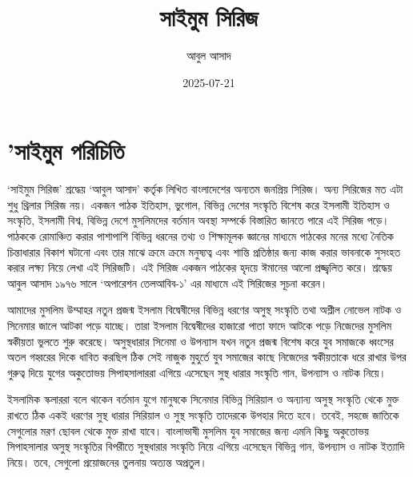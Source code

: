\documentclass[
]{book}
\title{সাইমুম সিরিজ}
\author{আবুল আসাদ}
\date{2025-07-21}
\begin{document}
\maketitle

{
\setcounter{tocdepth}{1}
\tableofcontents
}
\chapter*{'সাইমুম পরিচিতি}\label{ux9b8ux987ux9aeux9ae-ux9aaux9b0ux99aux9a4}

`সাইমুম সিরিজ' শ্রদ্ধেয় `আবুল আসাদ' কর্তৃক লিখিত বাংলাদেশের অন্যতম জনপ্রিয় সিরিজ। অন্য সিরিজের মত এটা শুধু থ্রিলার সিরিজ নয়। একজন পাঠক ইতিহাস, ভুগোল, বিভিন্ন দেশের সংস্কৃতি বিশেষ করে ইসলামী ইতিহাস ও সংস্কৃতি, ইসলামী বিশ্ব, বিভিন্ন দেশে মুসলিমদের বর্তমান অবস্থা সম্পর্কে বিস্তারিত জানতে পারে এই সিরিজ পড়ে। পাঠককে রোমাঞ্চিত করার পাশাপাশি বিভিন্ন ধরনের তথ্য ও শিক্ষামূলক জ্ঞানের মাধ্যমে পাঠকের মনের মধ্যে নৈতিক চিন্তাধারার বিকাশ ঘটানো এবং তার মাঝে ক্রমে ক্রমে মনুষ্যত্ব এবং শান্তি প্রতিষ্ঠার জন্য কাজ করার ভাবনাকে সুসংহত করার লক্ষ্য নিয়ে লেখা এই সিরিজটি। এই সিরিজ একজন পাঠকের হৃদয়ে ঈমানের আলো প্রজ্জ্বলিত করে। শ্রদ্ধেয় আবুল আসাদ ১৯৭৬ সালে `অপারেশন তেলআবিব-১' এর মাধ্যমে এই সিরিজের সূচনা করেন।

আমাদের মুসলিম উম্মাহর নতুন প্রজন্ম ইসলাম বিদ্বেষীদের বিভিন্ন ধরণের অসুস্থ সংস্কৃতি তথা অশ্লীল নোভেল নাটক ও সিনেমার জালে আটকা পড়ে যাচ্ছে। তারা ইসলাম বিদ্বেষীদের হাজারো পাতা ফাদে আটকে পড়ে নিজেদের মুসলিম স্বকীয়তা ভুলতে শুরু করেছে। অসুস্থধারার সিনেমা ও উপন্যাস যখন নতুন প্রজন্ম বিশেষ করে যুব সমাজকে ধ্বংসের অতল গহ্বরের দিকে ধাবিত করছিল ঠিক সেই নাজুক মুহুর্তে যুব সমাজের কাছে নিজেদের স্বকীয়তাকে ধরে রাখার উপর গুরুত্ব দিয়ে যুগের অকুতোভয় সিপাহসালাররা এগিয়ে এসেছেন সুস্থ ধারার সংস্কৃতি গান, উপন্যাস ও নাটক নিয়ে।

ইসলামিক স্কলাররা বলে থাকেন বর্তমান যুগে মানুষকে সিনেমার বিভিন্ন সিরিয়াল ও অন্যান্য অসুস্থ সংস্কৃতি থেকে মুক্ত রাখতে ঠিক একই ধরণের সুস্থ ধারার সিরিয়াল ও সুস্থ সংস্কৃতি তাদেরকে উপহার দিতে হবে। তবেই, সহজে জাতিকে সেগুলোর মরণ ছোবল থেকে মুক্ত রাখা যাবে। বাংলাভাষী মুসলিম যুব সমাজের জন্য এমনি কিছু অকুতোভয় সিপাহসালার অসুস্থ সংস্কৃতির বিপরীতে সুস্থধারার সংস্কৃতি নিয়ে এগিয়ে এসেছেন বিভিন্ন গান, উপন্যাস ও নাটক ইত্যাদি নিয়ে। তবে, সেগুলো প্রয়োজনের তুলনায় অত্যন্ত অপ্রতুল।
\end{document}
